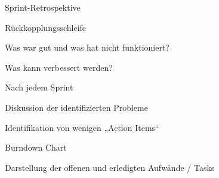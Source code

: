 \documentclass[a4paper]{article}
\begin{document}
\begin{multicols}{3}
  Sprint-Retrospektive
  \begin{itemize*}
    \item Rückkopplungsschleife
          \begin{itemize*}
            \item Was war gut und was hat nicht funktioniert?
            \item Was kann verbessert werden?
          \end{itemize*}
    \item Nach jedem Sprint
    \item Diskussion der identifizierten Probleme
    \item Identifikation von wenigen „Action Items“
  \end{itemize*}

  Burndown Chart
  \begin{itemize*}
    \item Darstellung der offenen und erledigten Aufwände / Tasks
  \end{itemize*}


\end{multicols}
\end{document}
